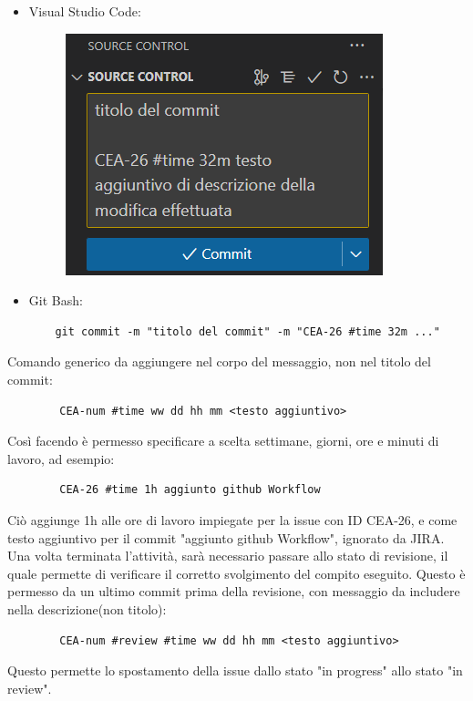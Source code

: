 	\begin{itemize}
		\item Visual Studio Code:
		\begin{figure}[h!]
			\centering
			\includegraphics[scale=0.7]{img/visual_code_example.png}
		\end{figure}
		\vspace{100pt}
		\item Git Bash:
		\begin{lstlisting}
	git commit -m "titolo del commit" -m "CEA-26 #time 32m ..."
		\end{lstlisting}
	\end{itemize}
	Comando generico da aggiungere nel corpo del messaggio, non nel titolo del commit:
	\begin{lstlisting}
		CEA-num #time ww dd hh mm <testo aggiuntivo>
	\end{lstlisting}
	Così facendo è permesso specificare a scelta settimane, giorni, ore e minuti di lavoro, ad esempio:
	\begin{lstlisting}
		CEA-26 #time 1h aggiunto github Workflow
	\end{lstlisting}
	Ciò aggiunge 1h alle ore di lavoro impiegate per la issue con ID CEA-26, e come testo aggiuntivo per il commit "aggiunto github Workflow", ignorato da JIRA.\\
	Una volta terminata l'attività, sarà necessario passare allo stato di revisione, il quale permette di verificare il corretto svolgimento del compito eseguito. Questo è permesso da un ultimo commit prima della revisione, con messaggio da includere nella descrizione(non titolo):
	\begin{lstlisting}
		CEA-num #review #time ww dd hh mm <testo aggiuntivo>
	\end{lstlisting}
	Questo permette lo spostamento della issue dallo stato "in progress" allo stato "in review".\\
